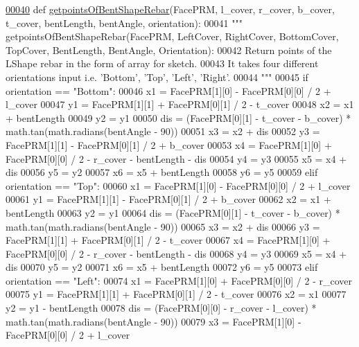 \begin{DoxyCode}
\hypertarget{namespaceBentShapeRebar.tex_l00040}{}\hyperlink{namespaceBentShapeRebar_a33951a8ab21a73bae42af9f81d7c43c3}{00040} \textcolor{keyword}{def }\hyperlink{namespaceBentShapeRebar_a33951a8ab21a73bae42af9f81d7c43c3}{getpointsOfBentShapeRebar}(FacePRM, l\_cover, r\_cover, b\_cover, t\_cover, 
      bentLength, bentAngle, orientation):
00041     \textcolor{stringliteral}{""" getpointsOfBentShapeRebar(FacePRM, LeftCover, RightCover, BottomCover, TopCover, BentLength,
       BentAngle, Orientation):}
00042 \textcolor{stringliteral}{    Return points of the LShape rebar in the form of array for sketch.}
00043 \textcolor{stringliteral}{    It takes four different orientations input i.e. 'Bottom', 'Top', 'Left', 'Right'.}
00044 \textcolor{stringliteral}{    """}
00045     \textcolor{keywordflow}{if} orientation == \textcolor{stringliteral}{"Bottom"}:
00046         x1 = FacePRM[1][0] - FacePRM[0][0] / 2 + l\_cover
00047         y1 = FacePRM[1][1] + FacePRM[0][1] / 2 - t\_cover
00048         x2 = x1 + bentLength
00049         y2 = y1
00050         dis = (FacePRM[0][1] - t\_cover - b\_cover) * math.tan(math.radians(bentAngle - 90))
00051         x3 = x2 + dis
00052         y3 = FacePRM[1][1] - FacePRM[0][1] / 2 + b\_cover
00053         x4 = FacePRM[1][0] + FacePRM[0][0] / 2 - r\_cover - bentLength - dis
00054         y4 = y3
00055         x5 = x4 + dis
00056         y5 = y2
00057         x6 = x5 + bentLength
00058         y6 = y5
00059     \textcolor{keywordflow}{elif} orientation == \textcolor{stringliteral}{"Top"}:
00060         x1 = FacePRM[1][0] - FacePRM[0][0] / 2 + l\_cover
00061         y1 = FacePRM[1][1] - FacePRM[0][1] / 2 + b\_cover
00062         x2 = x1 + bentLength
00063         y2 = y1
00064         dis = (FacePRM[0][1] - t\_cover - b\_cover) * math.tan(math.radians(bentAngle - 90))
00065         x3 = x2 + dis
00066         y3 = FacePRM[1][1] + FacePRM[0][1] / 2 - t\_cover
00067         x4 = FacePRM[1][0] + FacePRM[0][0] / 2 - r\_cover - bentLength - dis
00068         y4 = y3
00069         x5 = x4 + dis
00070         y5 = y2
00071         x6 = x5 + bentLength
00072         y6 = y5
00073     \textcolor{keywordflow}{elif} orientation == \textcolor{stringliteral}{"Left"}:
00074         x1 = FacePRM[1][0] + FacePRM[0][0] / 2 - r\_cover
00075         y1 = FacePRM[1][1] + FacePRM[0][1] / 2 - t\_cover
00076         x2 = x1
00077         y2 = y1 - bentLength
00078         dis = (FacePRM[0][0] - r\_cover - l\_cover) * math.tan(math.radians(bentAngle - 90))
00079         x3 = FacePRM[1][0] - FacePRM[0][0] / 2 + l\_cover

\end{DoxyCode}
